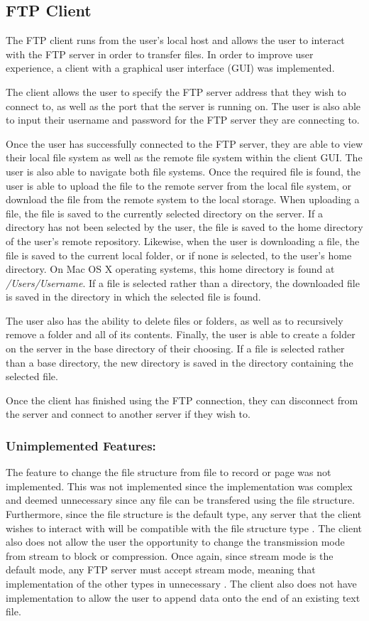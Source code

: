 \documentclass[10pt,twocolumn]{witseiepaper}
\begin{document}
\subsection{FTP Client}
The FTP client runs from the user's local host and allows the user to interact with the FTP server in order to transfer files. In order to improve user experience, a client with a graphical user interface (GUI) was implemented. 

The client allows the user to specify the FTP server address that they wish to connect to, as well as the port that the server is running on. The user is also able to input their username and password for the FTP server they are connecting to.

Once the user has successfully connected to the FTP server, they are able to view their local file system as well as the remote file system within the client GUI. The user is also able to navigate both file systems. Once the required file is found, the user is able to upload the file to the remote server from the local file system, or download the file from the remote system to the local storage. When uploading a file, the file is saved to the currently selected directory on the server. If a directory has not been selected by the user, the file is saved to the home directory of the user's remote repository. Likewise, when the user is downloading a file, the file is saved to the current local folder, or if none is selected, to the user's home directory. On Mac OS X operating systems, this home directory is found at \textit{/Users/Username}. If a file is selected rather than a directory, the downloaded file is saved in the directory in which the selected file is found.

The user also has the ability to delete files or folders, as well as to recursively remove a folder and all of its contents. Finally, the user is able to create a folder on the server in the base directory of their choosing. If a file is selected rather than a base directory, the new directory is saved in the directory containing the selected file.

Once the client has finished using the FTP connection, they can disconnect from the server and connect to another server if they wish to.

\subsubsection*{Unimplemented Features:}
The feature to change the file structure from file to record or page was not implemented. This was not implemented since the implementation was complex and deemed unnecessary since any file can be transfered using the file structure. Furthermore, since the file structure is the default type, any server that the client wishes to interact with will be compatible with the file structure type \cite{rfc}. The client also does not allow the user the opportunity to change the transmission mode from stream to block or compression. Once again, since stream mode is the default mode, any FTP server must accept stream mode, meaning that implementation of the other types in unnecessary \cite{rfc}. The client also does not have implementation to allow the user to append data onto the end of an existing text file.
\end{document}
